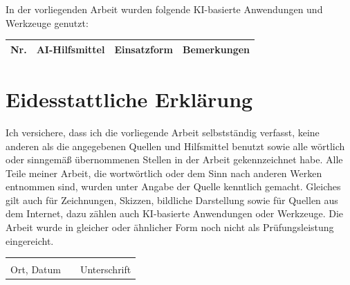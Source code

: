 \documentclass[12pt, a4paper, oneside]{article}
\newcommand{\aitools}{}          %
\newcounter{aitoolrow}           %
\newcommand{\printAIVerzeichnis}{%
    \setcounter{aitoolrow}{0}%
    \renewcommand{\arraystretch}{1.4}%
    \begin{tabularx}{\textwidth}{%
        >{\centering\arraybackslash}p{0.6cm}%
        p{3.4cm}%
        X%
        X%
    }%
    \toprule%
    \rowcolor{gray!20}%
    \textbf{Nr.} & \textbf{AI-Hilfsmittel} & \textbf{Einsatzform} & \textbf{Bemerkungen} \\%
    \midrule%
    \aitools%
    \bottomrule%
    \end{tabularx}%
    \renewcommand{\arraystretch}{1}%
}
\begin{document}
In der vorliegenden Arbeit wurden folgende KI-basierte Anwendungen und Werkzeuge genutzt:

\vspace{0.5cm}
\noindent
\printAIVerzeichnis
\newpage

\listofappendices
\newpage

\begin{appendices}

\end{appendices}

\newpage

\thispagestyle{fancy}
\section*{Eidesstattliche Erklärung}

Ich versichere, dass ich die vorliegende Arbeit selbstständig verfasst, keine
anderen als die angegebenen Quellen und Hilfsmittel benutzt sowie alle wörtlich
oder sinngemäß übernommenen Stellen in der Arbeit gekennzeichnet habe. Alle
Teile meiner Arbeit, die wortwörtlich oder dem Sinn nach anderen Werken
entnommen sind, wurden unter Angabe der Quelle kenntlich gemacht. Gleiches gilt
auch für Zeichnungen, Skizzen, bildliche Darstellung sowie für Quellen aus dem
Internet, dazu zählen auch KI-basierte Anwendungen oder Werkzeuge. Die Arbeit
wurde in gleicher oder ähnlicher Form noch nicht als Prüfungsleistung eingereicht.

\vspace{2.5cm}

\noindent
\begin{tabular}{p{6cm} p{2cm} p{6cm}}
    \hrulefill & & \hrulefill \\[0.3cm]
    Ort, Datum & & Unterschrift
\end{tabular}
\end{document}
